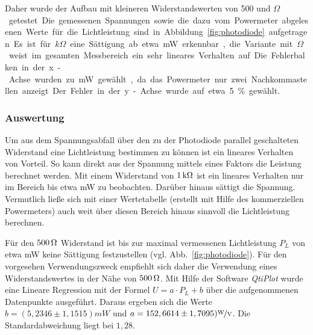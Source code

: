 Daher wurde der Aufbau mit kleineren Widerstandswerten von 500 und \unit[1000]{$\Omega$} getestet. Die gemessenen Spannungen sowie die dazu vom Powermeter abgelesenen Werte für die Lichtleistung sind in Abbildung~\ref{fig:photodiode} aufgetragen.

Es ist für \unit[1]{$k\Omega$} eine Sättigung ab etwa \unit[0,9]{mW} erkennbar, die Variante mit \unit[500]{$\Omega$} weist im gesamten Messbereich ein sehr lineares Verhalten auf. Die Fehlerbalken in der x-Achse wurden zu \unit[0,01]{mW} gewählt, da das Powermeter nur zwei Nachkommastellen anzeigt. Der Fehler in der y-Achse wurde auf etwa 5\% gewählt.


\subsubsection*{Auswertung}

Um aus dem Spannungsabfall über den zu der Photodiode parallel geschalteten Widerstand eine Lichtleistung bestimmen zu können ist ein lineares Verhalten von Vorteil. So kann direkt aus der Spannung mittels eines Faktors die Leistung berechnet werden. Mit einem Widerstand von $\unit[1]{k\Omega}$ ist ein lineares Verhalten nur im Bereich bis etwa \unit[0,7]{mW} zu beobachten. Darüber hinaus sättigt die Spannung. Vermutlich ließe sich mit einer Wertetabelle (erstellt mit Hilfe des kommerziellen Powermeters) auch weit über diesen Bereich hinaus sinnvoll die Lichtleistung berechnen.

Für den $\unit[500]{\Omega}$ Widerstand ist bis zur maximal vermessenen Lichtleistung $P_L$ von etwa \unit[1,1]{mW} keine Sättigung festzustellen (vgl. Abb.~\ref{fig:photodiode}). Für den vorgesehen Verwendungszweck empfiehlt sich daher die Verwendung eines Widerstandswertes in der Nähe von $\unit[500]{\Omega}$. Mit Hilfe der Software \textit{QtiPlot} wurde eine Lineare Regression mit der Formel $U=a\cdot P_L + b$ über die aufgenommenen Datenpunkte ausgeführt. Daraus ergeben sich die Werte $b=(5,2346 \pm 1,1515) \unit{mW} $ und $a= 152,6614\pm 1,7095) \unitfrac{W}{V}$. Die Standardabweichung liegt bei $1,28$.\\


